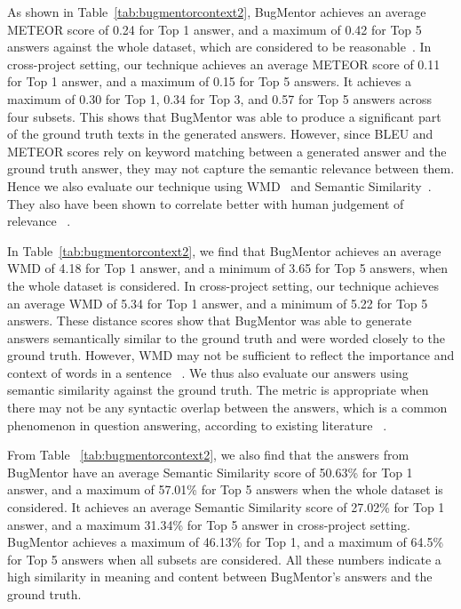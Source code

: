 As shown in Table~\ref{tab:bugmentorcontext2}, BugMentor achieves an average METEOR score of 0.24 for Top 1 answer, and a maximum of 0.42 for Top 5 answers against the whole dataset, which are considered to be reasonable~\cite{agarwal2008meteor}. In cross-project setting, our technique achieves an average METEOR score of 0.11 for Top 1 answer, and a maximum of 0.15 for Top 5 answers. It achieves a maximum of 0.30 for Top 1, 0.34 for Top 3, and 0.57 for Top 5 answers across four subsets. This shows that BugMentor was able to produce a significant part of the ground truth texts in the generated answers. However, since BLEU and METEOR scores rely on keyword matching between a generated answer and the ground truth answer, they may not capture the semantic relevance between them. Hence we also evaluate our technique using WMD~\cite{huang2016supervised} and Semantic Similarity~\cite{haque2022semantic}. They also have been shown to correlate better with human judgement of relevance ~\cite{papineni2002bleu, kusner2015word}. \par

In Table~\ref{tab:bugmentorcontext2}, we find that BugMentor achieves an average WMD of 4.18 for Top 1 answer, and a minimum of 3.65 for Top 5 answers, when the whole dataset is considered. In cross-project setting, our technique achieves an average WMD of 5.34 for Top 1 answer, and a minimum of 5.22 for Top 5 answers. These distance scores show that BugMentor was able to generate answers semantically similar to the ground truth and were worded closely to the ground truth. However, WMD may not be sufficient to reflect the importance and context of words in a sentence ~\cite{kusner2015word,sato2022re}. We thus also evaluate our answers using semantic similarity against the ground truth. The metric is appropriate when there may not be any syntactic overlap between the answers, which is a common phenomenon in question answering, according to existing literature ~\cite{yao2013answer,severyn2015learning}.\par

From Table ~\ref{tab:bugmentorcontext2}, we also find that the answers from BugMentor have an average Semantic Similarity score of  50.63\% for Top 1 answer, and a maximum of 57.01\% for Top 5 answers when the whole dataset is considered. It achieves an average Semantic Similarity score of 27.02\% for Top 1 answer, and a maximum 31.34\% for Top 5 answer in cross-project setting. BugMentor achieves a maximum of 46.13\% for Top 1, and a maximum of 64.5\% for Top 5 answers when all subsets are considered. All these numbers indicate a high similarity in meaning and content between BugMentor's answers and the ground truth.\par


